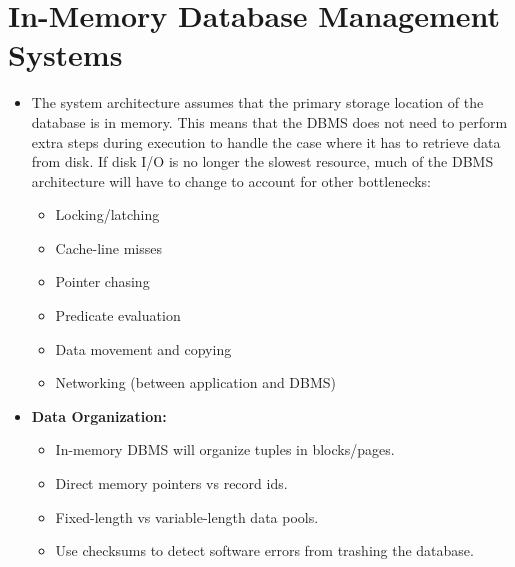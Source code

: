 \documentclass[11pt]{article}
\begin{document}
\section{In-Memory Database Management Systems}
\begin{itemize}
    \item
    The system architecture assumes that the primary storage location of the database is in 
    memory. This means that the DBMS does not need to perform extra steps during execution to 
    handle the case where it has to retrieve data from disk.
    If disk I/O is no longer the slowest resource, much of the DBMS architecture will have to 
    change to account for other bottlenecks:~\cite{stonebraker2007}
    \begin{itemize}
        \item Locking/latching
        \item Cache-line misses
        \item Pointer chasing
        \item Predicate evaluation
        \item Data movement and copying
        \item Networking (between application and DBMS)
    \end{itemize}
    
    \item \textbf{Data Organization:}
    \begin{itemize}
        \item
        In-memory DBMS will organize tuples in blocks/pages.
        
        \item
        Direct memory pointers vs record ids.
        
        \item
        Fixed-length vs variable-length data pools.
        
        \item
        Use checksums to detect software errors from trashing the database.
        
%             
    \end{itemize}
    

\end{itemize}
\end{document}
